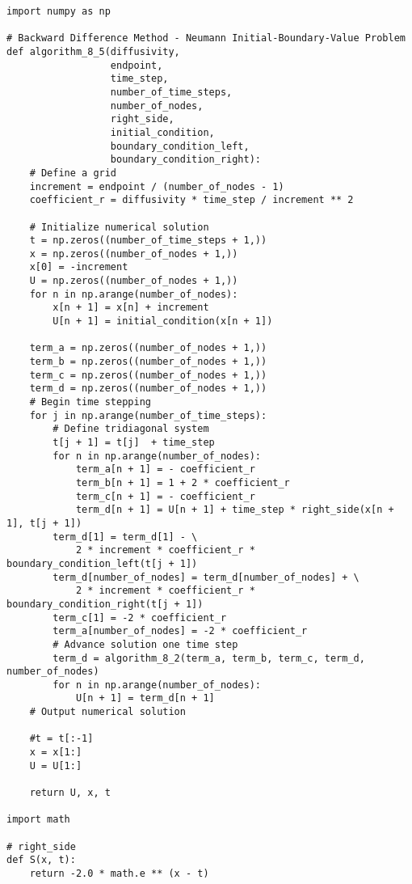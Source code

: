 \documentclass{amsbook}%
\theoremstyle{plain}
\numberwithin{equation}{section}
\begin{document}
\begin{small}
\begin{verbatim}
import numpy as np
        
# Backward Difference Method - Neumann Initial-Boundary-Value Problem
def algorithm_8_5(diffusivity,
                  endpoint,
                  time_step,
                  number_of_time_steps,
                  number_of_nodes,
                  right_side,
                  initial_condition,
                  boundary_condition_left,
                  boundary_condition_right):
    # Define a grid
    increment = endpoint / (number_of_nodes - 1)
    coefficient_r = diffusivity * time_step / increment ** 2
        
    # Initialize numerical solution
    t = np.zeros((number_of_time_steps + 1,))
    x = np.zeros((number_of_nodes + 1,))
    x[0] = -increment
    U = np.zeros((number_of_nodes + 1,)) 
    for n in np.arange(number_of_nodes):
        x[n + 1] = x[n] + increment
        U[n + 1] = initial_condition(x[n + 1])

    term_a = np.zeros((number_of_nodes + 1,))
    term_b = np.zeros((number_of_nodes + 1,))
    term_c = np.zeros((number_of_nodes + 1,))
    term_d = np.zeros((number_of_nodes + 1,))    
    # Begin time stepping  
    for j in np.arange(number_of_time_steps):
        # Define tridiagonal system
        t[j + 1] = t[j]  + time_step
        for n in np.arange(number_of_nodes):
            term_a[n + 1] = - coefficient_r
            term_b[n + 1] = 1 + 2 * coefficient_r
            term_c[n + 1] = - coefficient_r
            term_d[n + 1] = U[n + 1] + time_step * right_side(x[n + 1], t[j + 1])
        term_d[1] = term_d[1] - \
        	2 * increment * coefficient_r * boundary_condition_left(t[j + 1])
        term_d[number_of_nodes] = term_d[number_of_nodes] + \
        	2 * increment * coefficient_r * boundary_condition_right(t[j + 1])
        term_c[1] = -2 * coefficient_r
        term_a[number_of_nodes] = -2 * coefficient_r
        # Advance solution one time step
        term_d = algorithm_8_2(term_a, term_b, term_c, term_d, number_of_nodes)
        for n in np.arange(number_of_nodes):
            U[n + 1] = term_d[n + 1]   
    # Output numerical solution

    #t = t[:-1]
    x = x[1:]
    U = U[1:]
            
    return U, x, t

import math

# right_side
def S(x, t):
    return -2.0 * math.e ** (x - t)


\end{verbatim}
\end{small}
\end{document}
